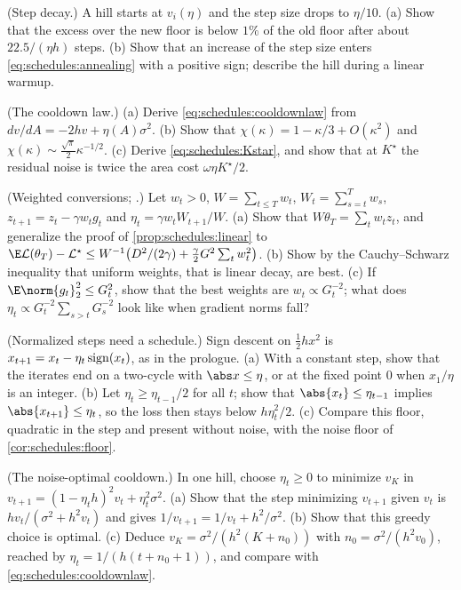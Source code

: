 \begin{refsection}
\begin{exercises}
\item \consolidation (Step decay.) A hill starts at $v_i(\eta)$ and the step size drops to $\eta/10$. (a) Show that the excess over the new floor is below $1\%$ of the old floor after about $22.5/(\eta h)$ steps. (b) Show that an increase of the step size enters \eqref{eq:schedules:annealing} with a positive sign; describe the hill during a linear warmup.\label{ex:schedules:step}

\item \consolidation (The cooldown law.) (a) Derive \eqref{eq:schedules:cooldownlaw} from $dv/dA=-2hv+\eta(A)\sigma^2$. (b) Show that $\chi(\kappa)=1-\kappa/3+O(\kappa^2)$ and $\chi(\kappa)\sim\frac{\sqrt\pi}2\kappa^{-1/2}$. (c) Derive \eqref{eq:schedules:Kstar}, and show that at $K^\star$ the residual noise is twice the area cost $\omega\eta K^\star/2$.\label{ex:schedules:law}

\item \variation (Weighted conversions; \textcite{DefazioEtAl2023}.) Let $w_t>0$, $W=\sum_{t\le T}w_t$, $W_t=\sum_{s=t}^Tw_s$, $z_{t+1}=z_t-\gamma w_tg_t$ and $\eta_t=\gamma w_tW_{t+1}/W$. (a) Show that $W\theta_T=\sum_tw_tz_t$, and generalize the proof of \cref{prop:schedules:linear} to $\E\Loss(\theta_T)-\Loss^\star\le W^{-1}\bigl(D^2/(2\gamma)+\frac\gamma2G^2\sum_tw_t^2\bigr)$. (b) Show by the Cauchy--Schwarz inequality that uniform weights, that is linear decay, are best. (c) If $\E\norm{g_t}_2^2\le G_t^2$, show that the best weights are $w_t\propto G_t^{-2}$; what does $\eta_t\propto G_t^{-2}\sum_{s>t}G_s^{-2}$ look like when gradient norms fall?\label{ex:schedules:weights}

\item \variation (Normalized steps need a schedule.) Sign descent on $\frac12hx^2$ is $x_{t+1}=x_t-\eta_t\operatorname{sign}(x_t)$, as in the prologue. (a) With a constant step, show that the iterates end on a two-cycle with $\abs x\le\eta$, or at the fixed point $0$ when $x_1/\eta$ is an integer. (b) Let $\eta_t\ge\eta_{t-1}/2$ for all $t$; show that $\abs{x_t}\le\eta_{t-1}$ implies $\abs{x_{t+1}}\le\eta_t$, so the loss then stays below $h\eta_t^2/2$. (c) Compare this floor, quadratic in the step and present without noise, with the noise floor of \cref{cor:schedules:floor}.\label{ex:schedules:sign}

\item \variation (The noise-optimal cooldown.) In one hill, choose $\eta_t\ge0$ to minimize $v_K$ in $v_{t+1}=(1-\eta_th)^2v_t+\eta_t^2\sigma^2$. (a) Show that the step minimizing $v_{t+1}$ given $v_t$ is $hv_t/(\sigma^2+h^2v_t)$ and gives $1/v_{t+1}=1/v_t+h^2/\sigma^2$. (b) Show that this greedy choice is optimal.  (c) Deduce $v_K=\sigma^2/(h^2(K+n_0))$ with $n_0=\sigma^2/(h^2v_0)$, reached by $\eta_t=1/(h(t+n_0+1))$, and compare with \eqref{eq:schedules:cooldownlaw}.\label{ex:schedules:greedy}


\end{exercises}
\end{refsection}
